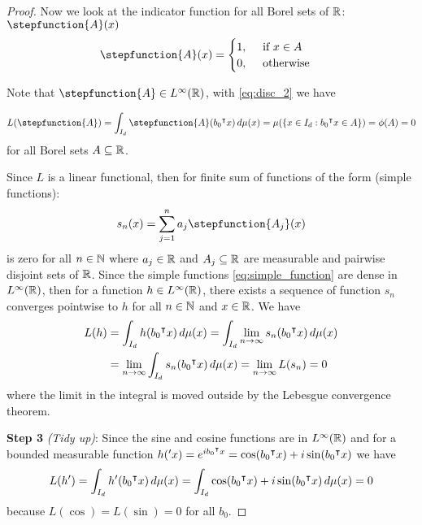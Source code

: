 \begin{proof}
    Now we look at the indicator function for all Borel sets of $\mathbb{R}$:
    $\stepfunction{A}(x)$
    \begin{equation}
        \stepfunction{A}(x) =
        \begin{cases}
            1, \quad \text{ if } x \in A \\
            0, \quad \text{ otherwise}
        \end{cases}
    \end{equation}

     Note that
    $\stepfunction{A} \in L^{\infty}(\R)$, with \eqref{eq:disc_2} we have 

    \begin{equation}
        L(\stepfunction{A}) = \int_{I_d} \stepfunction{A}(b_0\tr x)\,d\mu(x)
        = \mu(\{ x\in I_d: b_0\tr x\in A \}) = \phi(A) = 0
    \end{equation}
    for all Borel sets $A \subseteq \mathbb{R}$.

    Since $L$ is a linear functional, then for finite sum of functions of the
    form (simple functions):
    \begin{equation}
        \label{eq:simple_function}
        s_n(x) = \sum_{j=1}^{n} a_j \stepfunction{A_j}(x)
    \end{equation}
    is zero for all $n\in\mathbb{N}$ where $a_j \in \mathbb{R}$ and ${A_j} \subseteq \mathbb{R}$ are
    measurable and pairwise disjoint sets of $\mathbb{R}$. Since the simple functions
    \eqref{eq:simple_function} are dense in $L^{\infty}(\mathbb{R})$, then for a
    function $h \in L^{\infty}(\mathbb{R})$, there exists a sequence of function $s_n$
    converges pointwise to $h$ for all $n \in \mathbb{N}$ and $x \in \mathbb{R}$. We have
    \begin{align}
        L(h) &= \int_{I_d} h(b_0{}^{\intercal} x) \,d\mu(x) 
             = \int_{I_d} \lim_{n\to\infty} s_n(b_0{}^{\intercal} x) \,d\mu(x) \\
             &= \lim_{n\to\infty} \int_{I_d} s_n(b_0{}^{\intercal} x) \,d\mu(x)
             = \lim_{n\to\infty} L(s_n)
             = 0
    \end{align}
    where the limit in the integral is moved outside by the Lebesgue convergence
    theorem.

    \textbf{Step 3} \textit{(Tidy up)}: Since the sine and cosine functions are
    in $L^{\infty}(\mathbb{R})$ and for a bounded measurable function $h('x) =
    e^{ib_0{}^{\intercal} x} = \cos(b_0{}^{\intercal} x) + i \sin(b_0{}^{\intercal} x)$ we have
    \begin{equation}
        L(h') = \int_{I_d} h'(b_0{}^{\intercal} x) \,d\mu(x) 
              = \int_{I_d} \cos(b_0{}^{\intercal} x) + i \sin(b_0{}^{\intercal} x) \,d\mu(x)
              = 0
    \end{equation}
    because $L(\cos) = L(\sin) = 0$ for all $b_0$.


\end{proof}
